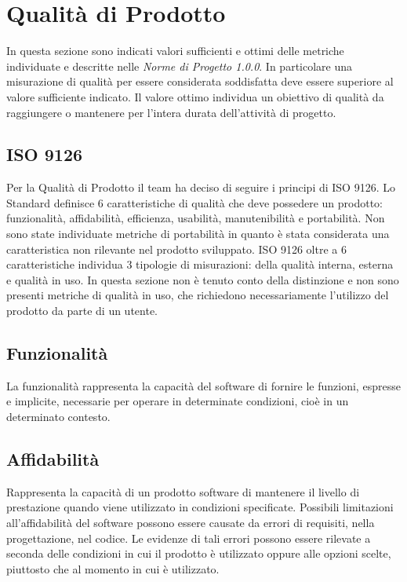 \section{Qualità di Prodotto}
In questa sezione sono indicati valori sufficienti e ottimi delle metriche individuate e descritte nelle \textit{Norme di Progetto 1.0.0}.
In particolare una misurazione di qualità per essere considerata soddisfatta deve essere superiore al valore sufficiente indicato. 
Il valore ottimo individua un obiettivo di qualità da raggiungere o mantenere per l'intera durata dell'attività di progetto.
\subsection{ISO 9126}
Per la Qualità di Prodotto il team ha deciso di seguire i principi di ISO 9126.
Lo Standard definisce 6 caratteristiche di qualità che deve possedere un prodotto: funzionalità, affidabilità, efficienza, usabilità, manutenibilità e portabilità. 
Non sono state individuate metriche di portabilità in quanto è stata considerata una caratteristica non rilevante nel prodotto sviluppato. 
ISO 9126 oltre a 6 caratteristiche individua 3 tipologie di misurazioni: della qualità interna, esterna e qualità in uso. 
In questa sezione non è tenuto conto della distinzione e non sono presenti metriche di qualità in uso, che richiedono necessariamente l'utilizzo del prodotto da parte di un utente.

\subsection{Funzionalità}
La funzionalità rappresenta la capacità del software di fornire le funzioni, espresse e implicite, necessarie per operare in determinate condizioni, cioè in un determinato contesto.
\def\productquality{
    {
        Correttezza dello scambio dei dati,
        $D_{err} = \#\ di\ errori$, 
        -,
        $D_{err} = 0$,
        un valore sufficiente sarà deciso in fasi successive del progetto
    },
}


\subsection{Affidabilità}
Rappresenta la capacità di un prodotto software di mantenere il livello di prestazione quando viene utilizzato in condizioni specificate. Possibili limitazioni all'affidabilità del software possono essere causate da errori di requisiti, nella progettazione, nel codice. Le evidenze di tali errori possono essere rilevate a seconda delle condizioni in cui il prodotto è utilizzato oppure alle opzioni scelte, piuttosto che al momento in cui è utilizzato.
\def\productquality{
    {
        Densità di errori,
        $E_{density} = A_{err}/B_{tests}$, 
        -,
        -,
        è stato ritenuto prematuro definire valori sufficienti e ottimi per la metrica
    },
}


